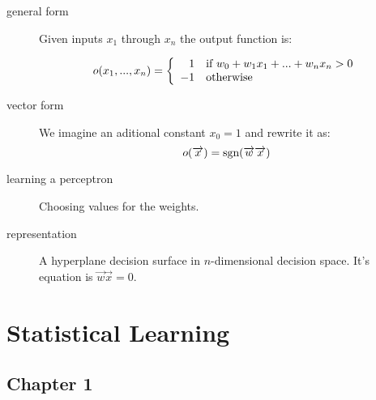 \documentclass[12pt]{article}
\begin{document}
\begin{description}

    \item[general form]
        Given inputs $x_1$ through $x_n$ the output function is:
        
        \begin{equation}
            o(x_1, ..., x_n) = \left\{
            \begin{array}{r l}
                1 & \text{if } w_0 + w_1 x_1 + ... + w_n x_n > 0\\
                -1 & \text{otherwise}
            \end{array}
            \right.
            \notag
        \end{equation}
        
    \item[vector form]
        We imagine an aditional constant $x_0 = 1$ and rewrite it as:
        \begin{equation}
            o(\overrightarrow{x}) =
                \text{sgn}(\overrightarrow{w}\overrightarrow{x})
            \notag
        \end{equation}
        
    \item[learning a perceptron] Choosing values for the weights.
    
    \item[representation] A hyperplane decision surface in $n$-dimensional
        decision space. It's equation is
        $\overrightarrow{w}\overrightarrow{x}=0$.

\end{description}

\section{Statistical Learning}

\subsection{Chapter 1}
\end{document}
